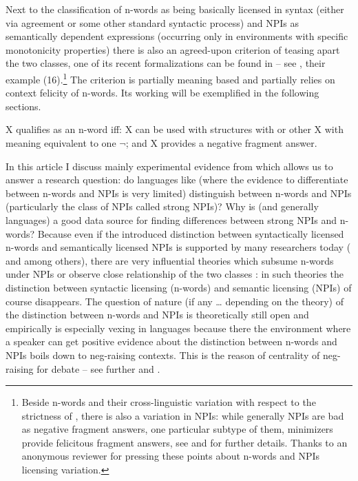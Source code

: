 \documentclass[output=paper, colorlinks, citecolor=brown, newtxmath]{langsci/langscibook}
\begin{document}
\noindent Next to the classification of n-words as being basically licensed in syntax (either via agreement or some other standard syntactic process) and NPIs as semantically dependent expressions (occurring only in environments with specific monotonicity properties) there is also an agreed-upon criterion of teasing apart the two classes, one of its recent formalizations can be found in \cite{giannakidou2017landscape} -- see , their example (16).\footnote{Beside n-words and their cross-linguistic variation with respect to the strictness of , there is also a variation in NPIs: while generally NPIs are bad as negative fragment answers, one particular subtype of them, minimizers provide felicitous fragment answers, see \cite{giannakidou1998polarity} and \cite{Blasczak:2001} for further details. Thanks to an anonymous reviewer for pressing these points about n-words and NPIs licensing variation.} The criterion is partially meaning based and partially relies on context felicity of n-words. Its working will be exemplified in the following sections.

\eanoraggedright  X qualifies as an n-word iff:\label{nwords-npi-crit}
\eanoraggedright X can be used with structures with  or other X with meaning equivalent to one $\neg$; and
\ex X provides a negative fragment answer.
\z
\z

\noindent In this article I discuss mainly experimental evidence from  which allows us to answer a research question: do languages like  (where the evidence to differentiate between n-words and NPIs is very limited) distinguish between n-words and NPIs (particularly the class of NPIs called strong NPIs)? Why is  (and generally  languages) a good data source for finding differences between strong NPIs and n-words? Because even if the introduced distinction between syntactically licensed n-words and semantically licensed NPIs is supported by many researchers today (\citealt{zwarts1998three,zeijlstra2004sentential} and \citealt{gajewski2011licensing} among others), there are very influential theories which subsume n-words under NPIs \citep{ladusaw1992expressing} or observe close relationship of the two classes \citep{laka1990negation}: in such theories the distinction between syntactic licensing (n-words) and semantic licensing (NPIs) of course disappears. The question of nature (if any \ldots { }depending on the theory) of the distinction between n-words and NPIs is theoretically still open and empirically is especially vexing in  languages because there the environment where a speaker can get positive evidence about the distinction between n-words and NPIs boils down to neg-raising contexts. This is the reason of centrality of neg-raising for  debate -- see further  and .
\end{document}
